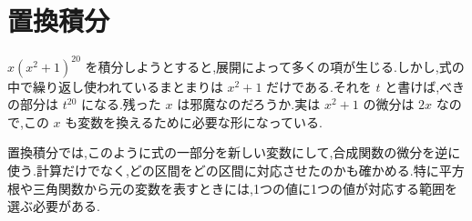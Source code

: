 \chapter{置換積分}\label{章:置換積分}

$x(x^2+1)^{20}$ を積分しようとすると,展開によって多くの項が生じる.しかし,式の中で繰り返し使われているまとまりは $x^2+1$ だけである.それを $t$ と書けば,べきの部分は $t^{20}$ になる.残った $x$ は邪魔なのだろうか.実は $x^2+1$ の微分は $2x$ なので,この $x$ も変数を換えるために必要な形になっている.

置換積分では,このように式の一部分を新しい変数にして,合成関数の微分を逆に使う.計算だけでなく,どの区間をどの区間に対応させたのかも確かめる.特に平方根や三角関数から元の変数を表すときには,1つの値に1つの値が対応する範囲を選ぶ必要がある.

%
%
%
%
%
%
%
